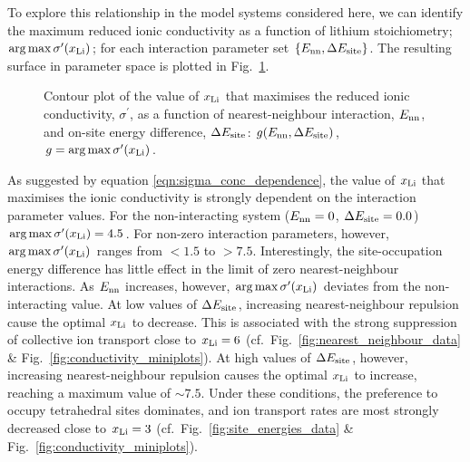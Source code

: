 \documentclass[aps,prb,twocolumn,superscriptaddress,reprint]{revtex4-1}
\newcommand{\set}[1]{\left\{#1\right\}}
\newcommand{\xLi}{x_\m{Li}}
\begin{document}
To explore this relationship in the model systems considered here, we can identify the maximum reduced ionic conductivity as a function of lithium stoichiometry; $\arg\max \sigma^\prime(\xLi)$; for each interaction parameter set $\set{E_\m{nn}, \Delta E_\m{site}}$. The resulting surface in parameter space is plotted in Fig.\ \ref{fig:max_sigma}.
\begin{figure}[tb]
  \centering
    \caption{\label{fig:max_sigma}Contour plot of the value of $\xLi$ that maximises the reduced ionic conductivity, $\sigma^\prime$, as a function of nearest-neighbour interaction, $E_{\mathrm{nn}}$, and on-site energy difference, $\Delta E_{\mathrm{site}}$: $g(E_{\mathrm{nn}}, \Delta E_{\mathrm{site}})$, $g = \arg \max \sigma^\prime(\xLi)$.}
\end{figure}
As suggested by equation \ref{eqn:sigma_conc_dependence}, the value of $\xLi$ that maximises the ionic conductivity is strongly dependent on the interaction parameter values. For the non-interacting system ($E_{\mathrm{nn}}=0$, $\Delta E_{\mathrm{site}}=0.0$) $\arg \max \sigma^\prime(\xLi)=4.5$. For non-zero interaction parameters, however, $\arg \max \sigma^\prime(\xLi)$ ranges from $<1.5$ to $>7.5$. Interestingly, the site-occupation energy difference has little effect in the limit of zero nearest-neighbour interactions. As $E_{\mathrm{nn}}$ increases, however, $\arg \max \sigma^\prime(\xLi)$ deviates from the non-interacting value. At low values of $\Delta E_{\mathrm{site}}$, increasing nearest-neighbour repulsion cause the optimal $\xLi$ to decrease. This is associated with the strong suppression of collective ion transport close to $\xLi=6$ (cf.\ Fig.~\ref{fig:nearest_neighbour_data} \& Fig.~\ref{fig:conductivity_miniplots}). At high values of $\Delta E_{\mathrm{site}}$, however, increasing nearest-neighbour repulsion causes the optimal $\xLi$ to increase, reaching a maximum value of $\sim7.5$. Under these conditions, the preference to occupy tetrahedral sites dominates, and ion transport rates are most strongly decreased close to $\xLi=3$ (cf.\ Fig.~\ref{fig:site_energies_data} \& Fig.~\ref{fig:conductivity_miniplots}).
\end{document}
